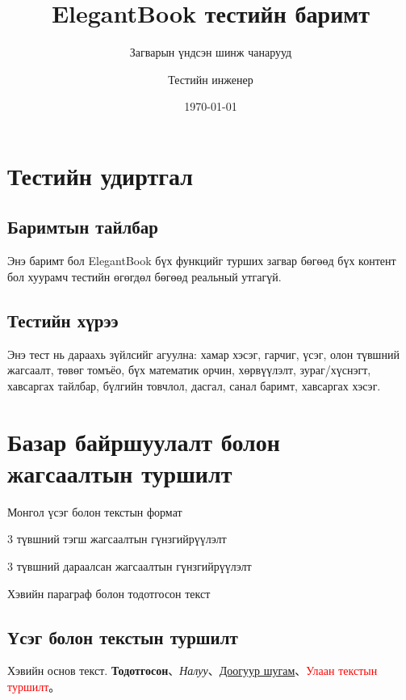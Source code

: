\documentclass[mn]{../../elegantbook}
\title{ElegantBook тестийн баримт}
\subtitle{Загварын үндсэн шинж чанарууд}
\author{Тестийн инженер}
\institute{Загварын тестийн баг}
\date{\today}
\begin{document}
\maketitle
\frontmatter
\tableofcontents

\setcounter{page}{0}
\chapter*{Тестийн удиртгал}
\section*{Баримтын тайлбар}
Энэ баримт бол ElegantBook бүх функцийг турших загвар бөгөөд бүх контент бол хуурамч тестийн өгөгдөл бөгөөд реальный утгагүй.
\newpage
\section*{Тестийн хүрээ}
Энэ тест нь дараахь зүйлсийг агуулна: хамар хэсэг, гарчиг, үсэг, олон түвшний жагсаалт, төвөг томъёо, бүх математик орчин, хөрвүүлэлт, зураг/хүснэгт, хавсаргах тайлбар, бүлгийн товчлол, дасгал, санал баримт, хавсаргах хэсэг.

\mainmatter

\chapter{Базар байршуулалт болон жагсаалтын туршилт}
\begin{introduction}
\item Монгол үсэг болон текстын формат
\item 3 түвшний тэгш жагсаалтын гүнзгийрүүлэлт
\item 3 түвшний дараалсан жагсаалтын гүнзгийрүүлэлт
\item Хэвийн параграф болон тодотгосон текст
\end{introduction}

\section{Үсэг болон текстын туршилт}
Хэвийн основ текст. \textbf{Тодотгосон}、\textit{Налуу}、\underline{Доогуур шугам}、\textcolor{red}{Улаан текстын туршилт}。
\end{document}
